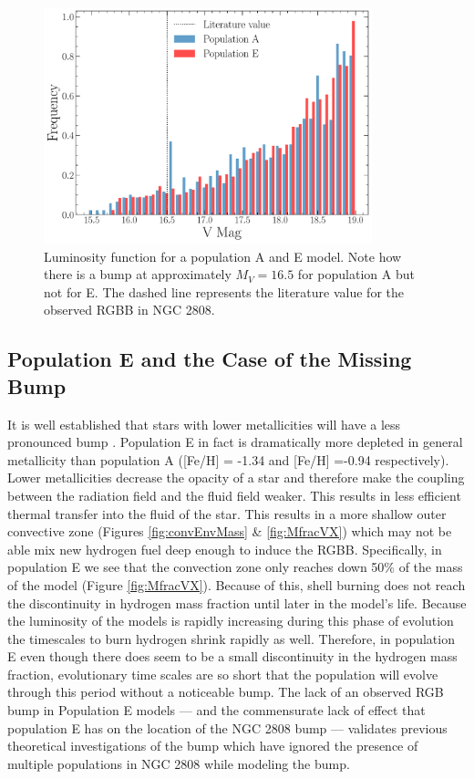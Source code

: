 \begin{figure}
  \centering
  \includegraphics[width=0.85\textwidth]{figures/rgbb/ComparisonOfRGBBump.pdf}
  \caption{Luminosity function for a population A and E model. Note how there
  is a bump at approximately $M_{V} = 16.5$ for population A but not for E. The
  dashed line represents the literature value for the observed RGBB in NGC
  2808.}
  \label{fig:LumFAE}
\end{figure}

\subsection{Population E and the Case of the Missing Bump}
It is well established that stars with lower metallicities will have a less
pronounced bump \citep{Cassisi2002, Bjork2006}. Population E in fact is
dramatically more depleted in general metallicity than population A ([Fe/H] =
-1.34 and [Fe/H] =-0.94 respectively). Lower metallicities decrease the opacity
of a star and therefore make the coupling between the radiation field and the
fluid field weaker. This results in less efficient thermal transfer into the
fluid of the star. This results in a more shallow outer convective zone
(Figures \ref{fig:convEnvMass} \& \ref{fig:MfracVX}) which may not be able mix
new hydrogen fuel deep enough to induce the RGBB. Specifically, in population E
we see that the convection zone only reaches down 50\% of the mass of the model
(Figure \ref{fig:MfracVX}). Because of this, shell burning does not reach the
discontinuity in hydrogen mass fraction until later in the model's life. Because
the luminosity of the models is rapidly increasing during this phase of
evolution the timescales to burn hydrogen shrink rapidly as well. Therefore, in
population E even though there does seem to be a small discontinuity in the
hydrogen mass fraction, evolutionary time scales are so short that the
population will evolve through this period without a noticeable bump. The lack
of an observed RGB bump in Population E models --- and the commensurate lack of
effect that population E has on the location of the NGC 2808 bump --- validates
previous theoretical investigations of the bump which have ignored the presence
of multiple populations in NGC 2808 while modeling the bump.


